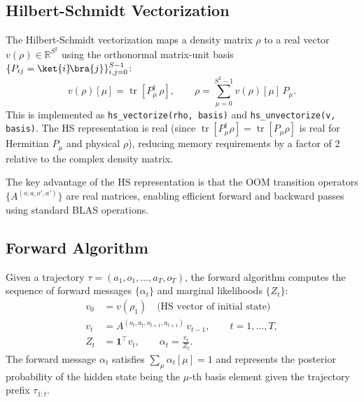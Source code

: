 
\subsection{Hilbert-Schmidt Vectorization}

The Hilbert-Schmidt vectorization maps a density matrix $\rho$ to a
real vector $v(\rho) \in \mathbb{R}^{S^2}$ using the orthonormal
matrix-unit basis $\{P_{ij} = \ket{i}\!\bra{j}\}_{i,j=0}^{S-1}$:
\begin{equation}
v(\rho)[\mu] = \operatorname{tr}[P_\mu^\dagger \, \rho],
\qquad
\rho = \sum_{\mu=0}^{S^2-1} v(\rho)[\mu] \, P_\mu.
\end{equation}
This is implemented as \verb|hs_vectorize(rho, basis)| and
\verb|hs_unvectorize(v, basis)|. The HS representation is real (since
$\operatorname{tr}[P_\mu^\dagger \rho] = \operatorname{tr}[P_\mu \rho]$
is real for Hermitian $P_\mu$ and physical $\rho$), reducing memory
requirements by a factor of 2 relative to the complex density matrix.


The key advantage of the HS representation is that the OOM transition
operators $\{A^{(o,a,o',a')}\}$ are real matrices, enabling efficient
forward and backward passes using standard BLAS operations.


\subsection{Forward Algorithm}

Given a trajectory $\tau = (a_1,o_1, \ldots, a_T,o_T)$, the forward
algorithm computes the sequence of forward messages $\{\alpha_t\}$ and
marginal likelihoods $\{Z_t\}$:
\begin{subequations}
\label{eq:forward_impl}
\begin{align}
v_0 &= v(\rho_1) \quad \text{(HS vector of initial state)} \\
v_t &= A^{(o_t,a_t,o_{t+1},a_{t+1})} \, v_{t-1}, \qquad t=1,\ldots,T, \\
Z_t &= \mathbf{1}^\top v_t, \qquad
\alpha_t = \frac{v_t}{Z_t}.
\end{align}
\end{subequations}
The forward message $\alpha_t$ satisfies $\sum_\mu \alpha_t[\mu] = 1$
and represents the posterior probability of the hidden state being the
$\mu$-th basis element given the trajectory prefix $\tau_{1:t}$.

